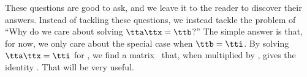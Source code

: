 

These questions are good to ask, and we leave it to the reader to discover their answers. Instead of tackling these questions, we instead tackle the problem of ``Why do we care about solving $\tta\ttx=\ttb$?'' The simple answer is that, for now, we only care about the special case when $\ttb=\tti$. By solving $\tta\ttx = \tti$ for \ttx, we find a matrix \ttx\ that, when multiplied by \tta, gives the identity \tti. That will be very useful.\\



